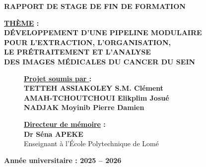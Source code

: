 \documentclass[12pt,a4paper]{report}
\begin{document}
\begin{titlepage}
\begin{minipage}{\dimexpr\textwidth-1.5cm\relax}
            \vspace*{1cm}
			\centering
			\textcolor{primaryblue}{{\Large \textbf{RAPPORT DE STAGE DE FIN DE FORMATION}}}

			\vspace*{0.4cm}
			\begin{tcolorbox}[colframe=primaryblue,boxrule=1.1mm,colback=primaryblue!10, left skip=0.5cm, right skip=0.5cm]
				\centering
				{\Large \textbf{\underline{THÈME} :}\\}
				\vspace*{0.2cm}
                {\Large
                \textcolor{primaryblue}{
                \textbf{
                    DÉVELOPPEMENT D'UNE PIPELINE MODULAIRE\\[0.15cm]
                    POUR L'EXTRACTION, L'ORGANISATION,\\[0.15cm]
                    LE PRÉTRAITEMENT ET L'ANALYSE\\[0.15cm]
                    DES IMAGES MÉDICALES DU CANCER DU SEIN
                    }
                }
                }
			\end{tcolorbox}
			
			\vspace*{0.8cm}
			\begin{figure}[H]
				\begin{minipage}{0.55\textwidth}
					\raggedright
					{\large \textbf{\underline{Projet soumis par } :}}\\
					\vspace*{0.3cm}
					{\normalsize \textbf{TETTEH ASSIAKOLEY S.M. Clément}}\\
					\vspace*{0.2cm}
					{\normalsize \textbf{AMAH-TCHOUTCHOUI Elikplim Josué}}\\
                    \vspace*{0.2cm}
					{\normalsize \textbf{NADJAK Moyinib Pierre Damien}}\\
				\end{minipage}
				\hfill
				\begin{minipage}{0.42\textwidth}
					\raggedright
					{\large \textbf{\underline{Directeur de mémoire} :}}\\
					\vspace*{0.3cm}
					{\normalsize \textbf{Dr Séna APEKE}} \\
                    {\normalsize Enseignant à l'École Polytechnique de Lomé}\\
				\end{minipage}
			\end{figure}
			\vspace*{1.2cm}
			\begin{center}
				{\Large \textbf{{Année universitaire} : 2025 -- 2026}}
			\end{center}
			
		\end{minipage}
		
	\end{titlepage}
	
\end{document}
